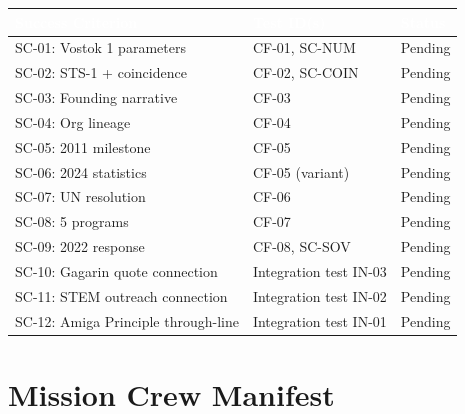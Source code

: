 \documentclass[11pt,letterpaper]{article}
\newcommand{\tableheader}[1]{\textbf{\sffamily\textcolor{white}{#1}}}
\begin{document}
\begin{center}
\begin{tabularx}{\textwidth}{XL{3.5cm}C{1.5cm}}
\toprule
{}
\tableheader{Success Criterion} & \tableheader{Test ID(s)} & \tableheader{Status} \\
\midrule
SC-01: Vostok 1 parameters & CF-01, SC-NUM & Pending \\
SC-02: STS-1 + coincidence & CF-02, SC-COIN & Pending \\
SC-03: Founding narrative & CF-03 & Pending \\
SC-04: Org lineage & CF-04 & Pending \\
SC-05: 2011 milestone & CF-05 & Pending \\
SC-06: 2024 statistics & CF-05 (variant) & Pending \\
SC-07: UN resolution & CF-06 & Pending \\
SC-08: 5 programs & CF-07 & Pending \\
SC-09: 2022 response & CF-08, SC-SOV & Pending \\
SC-10: Gagarin quote connection & Integration test IN-03 & Pending \\
SC-11: STEM outreach connection & Integration test IN-02 & Pending \\
SC-12: Amiga Principle through-line & Integration test IN-01 & Pending \\
\bottomrule
\end{tabularx}
\end{center}

\section{Mission Crew Manifest}
\end{document}
